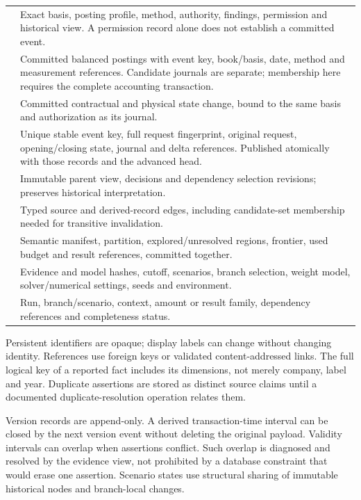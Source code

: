 \begin{longtable}{L{40mm}L{96mm}}
 & Exact basis, posting profile, method,
authority, findings, permission and historical view. A permission record
alone does not establish a committed event.\\
 & Committed balanced postings with event key, book/basis,
date, method and measurement references. Candidate journals are separate;
membership here requires the complete accounting transaction.\\
 & Committed contractual and physical state change,
bound to the same basis and authorization as its journal.\\
 & Unique stable event key, full request fingerprint,
original request, opening/closing state, journal and delta references.
Published atomically with those records and the advanced head.\\
 & Immutable parent view, decisions and dependency
selection revisions; preserves historical interpretation.\\
 & Typed source and derived-record edges, including
candidate-set membership needed for transitive invalidation.\\
 & Semantic manifest, partition, explored/unresolved
regions, frontier, used budget and result references, committed together.\\
 & Evidence and model hashes, cutoff, scenarios, branch selection,
weight model, solver/numerical settings, seeds and environment.\\
 & Run, branch/scenario, context, amount or result family,
dependency references and completeness status.\\\bottomrule
\end{longtable}

Persistent identifiers are opaque; display labels can change without changing
identity. References use foreign keys or validated content-addressed links.
The full logical key of a reported fact includes its dimensions, not merely
company, label and year. Duplicate assertions are stored as distinct source
claims until a documented duplicate-resolution operation relates them.

Version records are append-only. A derived transaction-time interval can be
closed by the next version event without deleting the original payload.
Validity intervals can overlap when assertions conflict. Such overlap is
diagnosed and resolved by the evidence view, not prohibited by a database
constraint that would erase one assertion. Scenario states use structural
sharing of immutable historical nodes and branch-local changes.

